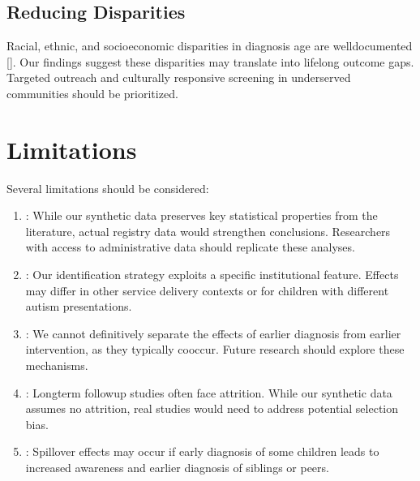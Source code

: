 \documentclass[letterpaper,10pt,english]{jupyterBook}
\begin{document}
\subsection{Reducing Disparities}
\label{\detokenize{discussion:reducing-disparities}}
\sphinxAtStartPar
Racial, ethnic, and socioeconomic disparities in diagnosis age are well\sphinxhyphen{}documented {[}{]}. Our findings suggest these disparities may translate into lifelong outcome gaps. Targeted outreach and culturally responsive screening in underserved communities should be prioritized.


\section{Limitations}
\label{\detokenize{discussion:limitations}}
\sphinxAtStartPar
Several limitations should be considered:
\begin{enumerate}
%
\item {} 
\sphinxAtStartPar
{}: While our synthetic data preserves key statistical properties from the literature, actual registry data would strengthen conclusions. Researchers with access to administrative data should replicate these analyses.

\item {} 
\sphinxAtStartPar
{}: Our identification strategy exploits a specific institutional feature. Effects may differ in other service delivery contexts or for children with different autism presentations.

\item {} 
\sphinxAtStartPar
{}: We cannot definitively separate the effects of earlier diagnosis from earlier intervention, as they typically co\sphinxhyphen{}occur. Future research should explore these mechanisms.

\item {} 
\sphinxAtStartPar
{}: Long\sphinxhyphen{}term follow\sphinxhyphen{}up studies often face attrition. While our synthetic data assumes no attrition, real studies would need to address potential selection bias.

\item {} 
\sphinxAtStartPar
{}: Spillover effects may occur if early diagnosis of some children leads to increased awareness and earlier diagnosis of siblings or peers.

\end{enumerate}
\end{document}
